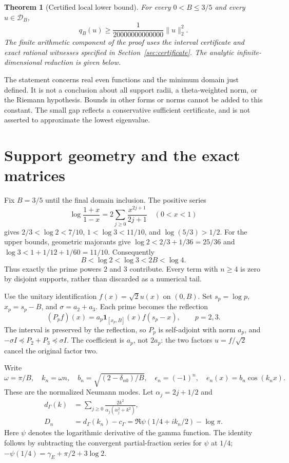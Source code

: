 \documentclass[11pt]{article}
\newtheorem{theorem}{Theorem}
\newcommand{\norm}[1]{\lVert#1\rVert}
\begin{document}
\begin{theorem}[Certified local lower bound]\label{thm:main}
For every $0<B\le3/5$ and every $u\in\mathcal D_B$,
\[
 \boxed{q_B(u)\ge\frac1{20000000000000}\norm u_2^2.}
\]
The finite arithmetic component of the proof uses the interval certificate and exact rational witnesses specified in Section~\ref{sec:certificate}. The analytic infinite-dimensional reduction is given below.
\end{theorem}

The statement concerns real even functions and the minimum domain just defined. It is not a conclusion about all support radii, a theta-weighted norm, or the Riemann hypothesis. Bounds in other forms or norms cannot be added to this constant. The small gap reflects a conservative sufficient certificate, and is not asserted to approximate the lowest eigenvalue.

\section{Support geometry and the exact matrices}
Fix $B=3/5$ until the final domain inclusion. The positive series
\[
 \log\frac{1+x}{1-x}=2\sum_{j\ge0}\frac{x^{2j+1}}{2j+1}
 \quad(0<x<1)
\]
gives $2/3<\log2<7/10$, $1<\log3<11/10$, and $\log(5/3)>1/2$. For the upper bounds, geometric majorants give $\log2<2/3+1/36=25/36$ and $\log3<1+1/12+1/60=11/10$. Consequently
\[
 B<\log2<\log3<2B<\log4.
\]
Thus exactly the prime powers $2$ and $3$ contribute. Every term with $n\ge4$ is zero by disjoint supports, rather than discarded as a numerical tail.

Use the unitary identification $f(x)=\sqrt2u(x)$ on $(0,B)$. Set $s_p=\log p$, $x_p=s_p-B$, and $\sigma=a_2+a_3$. Each prime becomes the reflection
\[
 (P_pf)(x)=a_p\mathbf1_{[x_p,B]}(x)f(s_p-x),\qquad p=2,3.
\]
The interval is preserved by the reflection, so $P_p$ is self-adjoint with norm $a_p$, and $-\sigma I\preceq P_2+P_3\preceq\sigma I$. The coefficient is $a_p$, not $2a_p$: the two factors $u=f/\sqrt2$ cancel the original factor two.

Write
\[
 \omega=\pi/B,\quad k_n=\omega n,\quad b_n=\sqrt{(2-\delta_{n0})/B},
 \quad \epsilon_n=(-1)^n,\quad e_n(x)=b_n\cos(k_nx).
\]
These are the normalized Neumann modes. Let $\alpha_j=2j+1/2$ and
\begin{align}
 d_\Gamma(k)&=\sum_{j\ge0}\frac{2k^2}{\alpha_j(\alpha_j^2+k^2)},\nonumber\\
 D_n&=d_\Gamma(k_n)-c_\Gamma
       =\Re\psi(1/4+ik_n/2)-\log\pi.\label{eq:D}
\end{align}
Here $\psi$ denotes the logarithmic derivative of the gamma function. The identity follows by subtracting the convergent partial-fraction series for $\psi$ at $1/4$; $-\psi(1/4)=\gamma_E+\pi/2+3\log2$.
\end{document}
